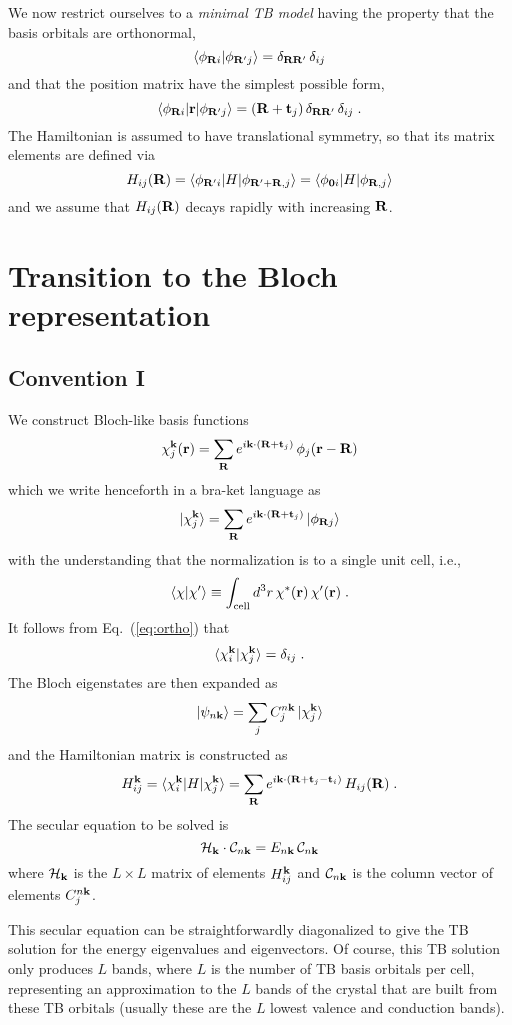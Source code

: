\documentclass[11pt]{article}
\numberwithin{equation}{section} %
\def\beq{\begin{equation}}
\def\eeq{\end{equation}}
\newcommand{\equ}[1]{Eq.~(\ref{eq:#1})}
\def\ket#1{\vert #1 \rangle}
\def\bra#1{\langle #1 \vert}
\def\me#1#2#3{\bra{#1}#2\ket{#3}}
\def\ip#1#2{\langle #1 \vert #2 \rangle}
\def\k{{\bf k}}
\def\r{{\bf r}}
\def\R{{\bf R}}
\def\t{{\bf t}}
\def\0{{\bf 0}}
\def\t{{\bf t}}
\begin{document}
We now restrict ourselves to a \textit{minimal TB model} having the
property that the basis orbitals are orthonormal,
%
\beq
\ip{\phi_{\R i}}{\phi_{\R' j}}=\delta_{\R\R'}\,\delta_{ij}
\label{eq:ortho}
\eeq
%
and that the position matrix have the simplest possible form,
%
\beq
\me{\phi_{\R i}}{\r}{\phi_{\R' j}}=(\R+\t_j)\,\delta_{\R\R'}\,\delta_{ij} \;.
\label{eq:posit}
\eeq
%
The Hamiltonian is assumed to have translational symmetry, so that its
matrix elements are defined via
%
\beq
H_{ij}(\R)=\me{\phi_{\R'i}}{H}{\phi_{\R'+\R,j}} 
          =\me{\phi_{\0 i}}{H}{\phi_{\R,j}}
\label{eq:ham}
\eeq
%
and we assume that $H_{ij}(\R)$ decays rapidly with increasing $\R$.

\section{Transition to the Bloch representation}

\subsection{Convention I}

We construct Bloch-like basis functions
%
\beq
\chi^\k_j(\r)=\sum_\R e^{i\k\cdot(\R+\t_j)}\,\phi_j(\r-\R)
\eeq
%
which we write henceforth in a bra-ket language as
%
\beq
\ket{\chi^\k_j}=\sum_\R e^{i\k\cdot(\R+\t_j)}\,\ket{\phi_{\R j}}
\eeq
%
with the understanding that the normalization is to a single
unit cell, i.e.,
%
\beq
\ip{\chi}{\chi'} \equiv \int_\textrm{cell} d^3r\,\chi^*(\r) \,\chi'(\r)\;.
\eeq
%
It follows from \equ{ortho} that
%
\beq
\ip{\chi^\k_i}{\chi^{\k}_j}=\delta_{ij} \;.
\eeq
%
The Bloch eigenstates are then expanded as
%
\beq
\ket{\psi_{n\k}} = \sum_j C_j^{n\k} \, \ket{\chi^\k_j}
\eeq
%
and the Hamiltonian matrix is constructed as
%
\beq
H_{ij}^\k = \me{\chi_i^\k}{H}{\chi_j^\k}
=\sum_\R e^{i\k\cdot(\R+\t_j-\t_i)}\,H_{ij}(\R) \;.
\label{eq:Hk}
\eeq
%
The secular equation to be solved is
%
\beq
{\cal H}_\k\cdot {\cal C}_{n\k} = E_{n\k}\,{\cal C}_{n\k}
\eeq
%
where ${\cal H}_\k$ is the $L\times L$ matrix of elements
$H_{ij}^\k$ and ${\cal C}_{n\k}$ is the column vector of
elements $C_j^{n\k}$.

This secular equation can be straightforwardly diagonalized to
give the TB solution for the energy eigenvalues and eigenvectors.
Of course, this TB solution only produces $L$ bands, where $L$ is
the number of TB basis orbitals per cell, representing an approximation
to the $L$ bands of the crystal that are built from these TB
orbitals (usually these are the $L$ lowest valence and
conduction bands).
\end{document}
